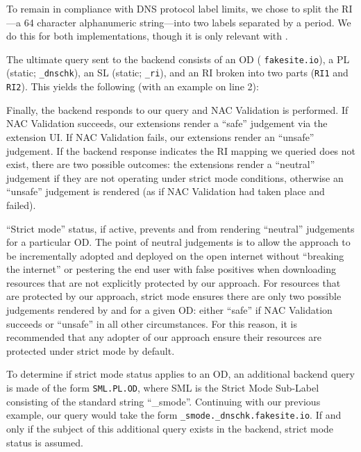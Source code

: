 To remain in compliance with DNS protocol label limits, we chose to split the
RI---a 64 character alphanumeric string---into two labels separated by a period.
We do this for both implementations, though it is only relevant with \DNSSYS{}.

The ultimate query sent to the backend consists of an OD (\eg
\texttt{fakesite.io}), a PL (static; \ie \texttt{\_dnschk}), an SL (static; \ie
\texttt{\_ri}), and an RI broken into two parts (\ie \texttt{RI1} and
\texttt{RI2}). This yields the following (with an example on line 2): \\

Finally, the backend responds to our query and NAC Validation is performed. If
NAC Validation succeeds, our extensions render a ``safe'' judgement via the
extension UI. If NAC Validation fails, our extensions render an ``unsafe''
judgement. If the backend response indicates the RI mapping we queried does not
exist, there are two possible outcomes: the extensions render a ``neutral''
judgement if they are not operating under strict mode conditions, otherwise an
``unsafe'' judgement is rendered (as if NAC Validation had taken place and
failed).

``Strict mode'' status, if active, prevents \DNSSYS{} and \DHTSYS{} from
rendering ``neutral'' judgements for a particular OD. The point of neutral
judgements is to allow the \SYSTEM{} approach to be incrementally adopted and
deployed on the open internet without ``breaking the internet'' or pestering the
end user with false positives when downloading resources that are not explicitly
protected by our approach. For resources that are protected by our approach,
strict mode ensures there are only two possible judgements rendered by \DNSSYS{}
and \DHTSYS{} for a given OD: either ``safe'' if NAC Validation succeeds or
``unsafe'' in all other circumstances. For this reason, it is recommended that
any adopter of our approach ensure their resources are protected under strict
mode by default.

To determine if strict mode status applies to an OD, an additional backend query
is made of the form \texttt{SML.PL.OD}, where SML is the Strict Mode Sub-Label
consisting of the standard string ``\_smode''. Continuing with our previous
example, our query would take the form \texttt{\_smode.\_dnschk.fakesite.io}. If
and only if the subject of this additional query exists in the backend, strict
mode status is assumed.

